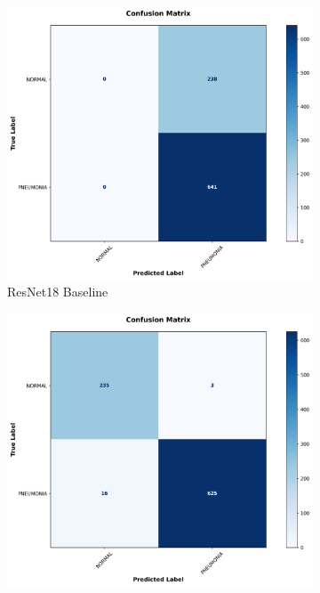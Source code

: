 \documentclass[preprint,12pt]{elsarticle}
\begin{document}
\begin{figure}[!t]
\begin{subfigure}[b]{0.24\columnwidth}
\centering
\includegraphics[width=\columnwidth]{fig/cm/chest_xray/resnet18.png}
\caption{ResNet18 Baseline}
\label{fig:confusion_baseline_chest}
\end{subfigure}
\hfill
\begin{subfigure}[b]{0.24\columnwidth}
\centering
\includegraphics[width=\columnwidth]{fig/cm/chest_xray/no_afd_mfe_msf.png}

\end{subfigure}
\end{figure}
\end{document}
